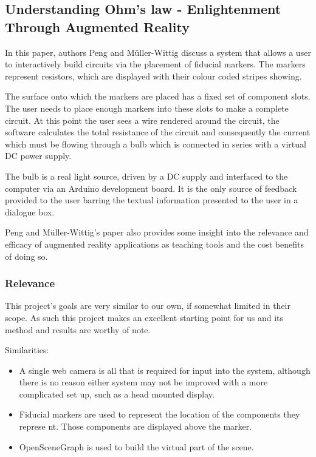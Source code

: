 \subsection{Understanding Ohm's law - Enlightenment Through Augmented Reality}
In this paper\cite{peng2010understanding}, authors Peng and M\"{u}ller-Wittig discuss a system that allows a user to interactively build circuits via the placement of fiducial markers. The markers represent resistors, which are displayed with their colour coded stripes showing. 

The surface onto which the markers are placed has a fixed set of component slots. The user needs to place enough markers into these slots to make a complete circuit. At this point the user sees a wire rendered around the circuit, the software calculates the total resistance of the circuit and consequently the current which must be flowing through a bulb which is connected in series with a virtual DC power supply.

The bulb is a real light source, driven by a DC supply and interfaced to the computer via an Arduino development board. It is the only source of feedback provided to the user barring the textual information presented to the user in a dialogue box.

Peng and M\"{u}ller-Wittig's paper also provides some insight into the relevance and efficacy of augmented reality applications as teaching tools and the cost benefits of doing so.

\subsubsection{Relevance}
This project's goals are very similar to our own, if somewhat limited in their scope. As such this project makes an excellent starting point for us and its method and results are worthy of note.

Similarities:
\begin{itemize}
\item A single web camera is all that is required for input into the system, although there is no reason either system may not be improved with a more complicated set up, such as a head mounted display.
\item Fiducial markers are used to represent the location of the components they represe                                                                                                                                                                                                                      nt. Those components are displayed above the marker.
\item OpenSceneGraph is used to build the virtual part of the scene.
\end{itemize}

